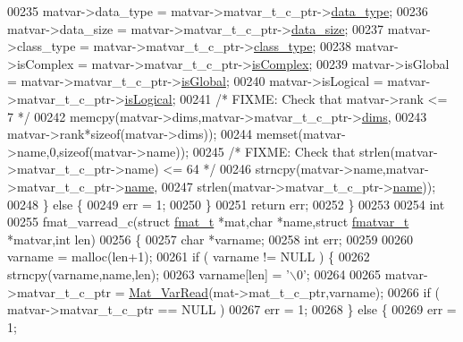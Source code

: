 \begin{DoxyCode}
{{00235         matvar->data\_type  = matvar->matvar\_t\_c\_ptr->\hyperlink{group___m_a_t_ab6aafe9bd77f0f077852593dec438144}{data\_type};
00236         matvar->data\_size  = matvar->matvar\_t\_c\_ptr->\hyperlink{group___m_a_t_a9ad1c82e2b568da617e12dc73a26e1f9}{data\_size};
00237         matvar->class\_type = matvar->matvar\_t\_c\_ptr->\hyperlink{group___m_a_t_aff13035bf3265dd7d9425e5d40c839d4}{class\_type};
00238         matvar->isComplex  = matvar->matvar\_t\_c\_ptr->\hyperlink{group___m_a_t_aeb03b3a69f108dc05470b00443a43739}{isComplex};
00239         matvar->isGlobal   = matvar->matvar\_t\_c\_ptr->\hyperlink{group___m_a_t_af26c71c4c0ddb14931d15910dddac1bc}{isGlobal};
00240         matvar->isLogical  = matvar->matvar\_t\_c\_ptr->\hyperlink{group___m_a_t_a866c1539e68073a837833d74cd4a65be}{isLogical};
00241         \textcolor{comment}{/* FIXME: Check that matvar->rank <= 7 */}
00242         memcpy(matvar->dims,matvar->matvar\_t\_c\_ptr->\hyperlink{group___m_a_t_a8e01234e1c862ce3472bb37f5a09b92c}{dims},
00243                matvar->rank*\textcolor{keyword}{sizeof}(matvar->dims));
00244         memset(matvar->name,0,\textcolor{keyword}{sizeof}(matvar->name));
00245         \textcolor{comment}{/* FIXME: Check that strlen(matvar->matvar\_t\_c\_ptr->name) <= 64 */}
00246         strncpy(matvar->name,matvar->matvar\_t\_c\_ptr->\hyperlink{group___m_a_t_a5d4b55b041e3b4fb50c04337f05ad909}{name},
00247                 strlen(matvar->matvar\_t\_c\_ptr->\hyperlink{group___m_a_t_a5d4b55b041e3b4fb50c04337f05ad909}{name}));
00248     \} \textcolor{keywordflow}{else} \{
00249         err = 1;
00250     \}
00251     \textcolor{keywordflow}{return} err;
00252 \}
00253 
00254 \textcolor{keywordtype}{int}
00255 fmat\_varread\_c(\textcolor{keyword}{struct} \hyperlink{structfmat__t}{fmat\_t} *mat,\textcolor{keywordtype}{char} *name,\textcolor{keyword}{struct} \hyperlink{structfmatvar__t}{fmatvar\_t} *matvar,\textcolor{keywordtype}{int} len)
00256 \{
00257     \textcolor{keywordtype}{char} *varname;
00258     \textcolor{keywordtype}{int}   err;
00259 
00260     varname = malloc(len+1);
00261     \textcolor{keywordflow}{if} ( varname != NULL ) \{
00262         strncpy(varname,name,len);
00263         varname[len] = \textcolor{charliteral}{'\(\backslash\)0'};
00264 
00265         matvar->matvar\_t\_c\_ptr = \hyperlink{group___m_a_t_ga3505f63029763eaa73d5a19f1115eb42}{Mat\_VarRead}(mat->mat\_t\_c\_ptr,varname);
00266         \textcolor{keywordflow}{if} ( matvar->matvar\_t\_c\_ptr == NULL )
00267             err = 1;
00268     \} \textcolor{keywordflow}{else} \{
00269         err = 1;
}}
\end{DoxyCode}
